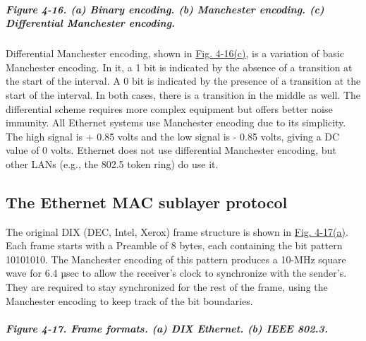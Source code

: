 \documentclass[b5paper,11pt]{memoir}
\begin{document}
\subparagraph[Figure 4-16. (a) Binary encoding. (b) Manchester encoding.
(c) Differential Manchester
encoding.]{\texorpdfstring{\protect\hypertarget{0130661023_ch04lev1sec3.htmlux5cux23ch04fig16}{}{}Figure
4-16. (a) Binary encoding. (b) Manchester encoding. (c) Differential
Manchester
encoding.}{Figure 4-16. (a) Binary encoding. (b) Manchester encoding. (c) Differential Manchester encoding.}}


Differential Manchester encoding, shown in
\protect\hyperlink{0130661023_ch04lev1sec3.htmlux5cux23ch04fig16}{Fig.
4-16(c)}, is a variation of basic Manchester encoding. In it, a 1 bit is
indicated by the absence of a transition at the start of the interval. A
0 bit is indicated by the presence of a transition at the start of the
interval. In both cases, there is a transition in the middle as well.
The differential scheme requires more complex equipment but offers
better noise immunity. All Ethernet systems use Manchester encoding due
to its simplicity. The high signal is + 0.85 volts and the low signal is
- 0.85 volts, giving a DC value of 0 volts. Ethernet does not use
differential Manchester encoding, but other LANs (e.g., the 802.5 token
ring) do use it.

\protect\hypertarget{0130661023_ch04lev1sec3.htmlux5cux23ch04lev2sec11}{}{}

\subsection{The Ethernet MAC sublayer protocol}

The original DIX (DEC, Intel, Xerox) frame structure is shown in
\protect\hyperlink{0130661023_ch04lev1sec3.htmlux5cux23ch04fig17}{Fig.
4-17(a)}. Each frame starts with a {Preamble} of 8 bytes, each
containing the bit pattern 10101010. The Manchester encoding of this
pattern produces a 10-MHz square wave for 6.4 µsec to allow the
receiver's clock to synchronize with the sender's. They are required to
stay synchronized for the rest of the frame, using the Manchester
encoding to keep track of the bit boundaries.

\subparagraph[Figure 4-17. Frame formats. (a) DIX Ethernet. (b) IEEE
802.3.]{\texorpdfstring{\protect\hypertarget{0130661023_ch04lev1sec3.htmlux5cux23ch04fig17}{}{}Figure
4-17. Frame formats. (a) DIX Ethernet. (b) IEEE
802.3.}{Figure 4-17. Frame formats. (a) DIX Ethernet. (b) IEEE 802.3.}}

\end{document}
